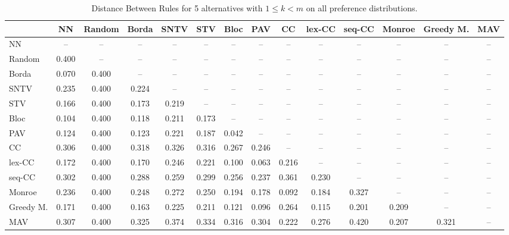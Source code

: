 
\begin{table*}
\centering
\begin{tabular}{lccccccccccccc}
\toprule
 & NN & Random & Borda & SNTV & STV & Bloc & PAV & CC & lex-CC & seq-CC & Monroe & Greedy M. & MAV \\
\midrule
NN & -- & -- & -- & -- & -- & -- & -- & -- & -- & -- & -- & -- & -- \\
Random & 0.400 & -- & -- & -- & -- & -- & -- & -- & -- & -- & -- & -- & -- \\
Borda & 0.070 & 0.400 & -- & -- & -- & -- & -- & -- & -- & -- & -- & -- & -- \\
SNTV & 0.235 & 0.400 & 0.224 & -- & -- & -- & -- & -- & -- & -- & -- & -- & -- \\
STV & 0.166 & 0.400 & 0.173 & 0.219 & -- & -- & -- & -- & -- & -- & -- & -- & -- \\
Bloc & 0.104 & 0.400 & 0.118 & 0.211 & 0.173 & -- & -- & -- & -- & -- & -- & -- & -- \\
PAV & 0.124 & 0.400 & 0.123 & 0.221 & 0.187 & 0.042 & -- & -- & -- & -- & -- & -- & -- \\
CC & 0.306 & 0.400 & 0.318 & 0.326 & 0.316 & 0.267 & 0.246 & -- & -- & -- & -- & -- & -- \\
lex-CC & 0.172 & 0.400 & 0.170 & 0.246 & 0.221 & 0.100 & 0.063 & 0.216 & -- & -- & -- & -- & -- \\
seq-CC & 0.302 & 0.400 & 0.288 & 0.259 & 0.299 & 0.256 & 0.237 & 0.361 & 0.230 & -- & -- & -- & -- \\
Monroe & 0.236 & 0.400 & 0.248 & 0.272 & 0.250 & 0.194 & 0.178 & 0.092 & 0.184 & 0.327 & -- & -- & -- \\
Greedy M. & 0.171 & 0.400 & 0.163 & 0.225 & 0.211 & 0.121 & 0.096 & 0.264 & 0.115 & 0.201 & 0.209 & -- & -- \\
MAV & 0.307 & 0.400 & 0.325 & 0.374 & 0.334 & 0.316 & 0.304 & 0.222 & 0.276 & 0.420 & 0.207 & 0.321 & -- \\
\bottomrule
\end{tabular}

\caption{Distance Between Rules for 5 alternatives with $1 \leq k < m$ on all preference distributions.}
\end{table*}
